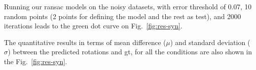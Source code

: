 Running our ransac models on the noisy datasets, with error threshold of 0.07,
10 random points (2 points for defining the model and the rest as test), and
2000 iterations leads to the green dot curve on Fig.~\ref{fig:res-syn}.

The quantitative results in terms of mean difference ($\mu$) and standard
deviation ($\sigma$) between the predicted rotations and \gls{gt}, for all the
conditions are also shown in the Fig.~\ref{fig:res-syn}.




